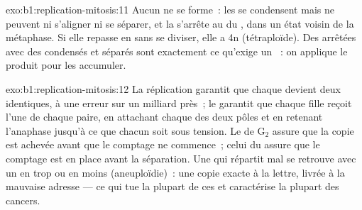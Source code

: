 \begin{solution}{exo:b1:replication-mitosis:11}
Aucun  ne se forme~: les  se condensent mais ne peuvent
ni s'aligner ni se séparer, et la  s'arrête au 
du , dans un état voisin de la métaphase. Si elle repasse en
 sans se diviser, elle a 4n  (tétraploïde). Des
 arrêtées avec des  condensés et séparés sont
exactement ce qu'exige un ~: on applique le produit pour les
accumuler.
\end{solution}

\begin{solution}{exo:b1:replication-mitosis:12}
La réplication garantit que chaque  devient deux 
identiques, à une erreur sur un milliard près~; le  garantit que
chaque fille reçoit l'une de chaque paire, en attachant chaque
 des deux pôles et en retenant l'anaphase jusqu'à ce que
chacun soit sous tension. Le  de G$_2$ assure que la
copie est achevée avant que le comptage ne commence~; celui du 
assure que le comptage est en place avant la séparation. Une  qui
répartit mal se retrouve avec un  en trop ou en moins
(aneuploïdie)~: une copie exacte à la lettre, livrée à la mauvaise
adresse --- ce qui tue la plupart de ces  et caractérise la
plupart des cancers.
\end{solution}

